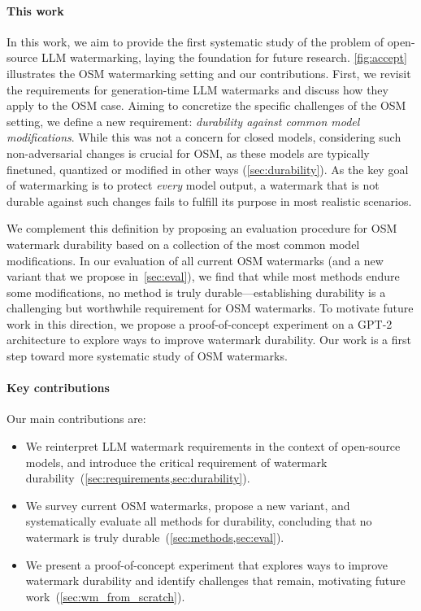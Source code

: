 \paragraph{This work}
In this work, we aim to provide the first systematic study of the problem of open-source LLM watermarking, laying the foundation for future research.
\cref{fig:accept} illustrates the OSM watermarking setting and our contributions.
First, we revisit the requirements for generation-time LLM watermarks and discuss how they apply to the OSM case.
Aiming to concretize the specific challenges of the OSM setting, we define a new requirement: \emph{durability against common model modifications}.
While this was not a concern for closed models, considering such non-adversarial changes is crucial for OSM, as these models are typically finetuned, quantized or modified in other ways (\cref{sec:durability}).
As the key goal of watermarking is to protect \emph{every} model output, a watermark that is not durable against such changes fails to fulfill its purpose in most realistic scenarios.
 
We complement this definition by proposing an evaluation procedure for OSM watermark durability based on a collection of the most common model modifications. In our evaluation of all current OSM watermarks (and a new variant that we propose in~\cref{sec:eval}), we find that while most methods endure some modifications, no method is truly durable---establishing durability is a challenging but worthwhile requirement for OSM watermarks.
To motivate future work in this direction, we propose a proof-of-concept experiment on a \textsc{GPT-2} architecture to explore ways to improve watermark durability.  
Our work is a first step toward more systematic study of OSM watermarks.

\paragraph{Key contributions}
Our main contributions are: 
\begin{itemize}
    \item We reinterpret LLM watermark requirements in the context of open-source models, and introduce the critical requirement of watermark durability~(\cref{sec:requirements,sec:durability}).
    \item We survey current OSM watermarks, propose a new variant, and systematically evaluate all methods for durability, concluding that no watermark is truly durable~(\cref{sec:methods,sec:eval}).
    \item We present a proof-of-concept experiment that explores ways to improve watermark durability and identify challenges that remain, motivating future work~(\cref{sec:wm_from_scratch}). 
\end{itemize}

 
